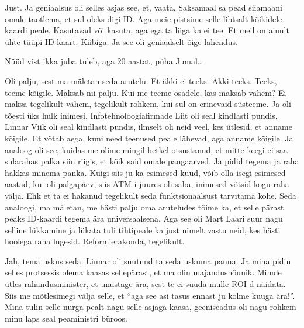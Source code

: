 
Just. Ja geniaalsus oli selles asjas see, et, vaata, Saksamaal sa pead 
siiamaani omale taotlema, et sul oleks digi-ID.  Aga meie pistsime selle 
lihtsalt kõikidele kaardi peale. Kasutavad või kasuta, aga ega ta liiga ka ei 
tee. Et meil on ainult ühte tüüpi ID-kaart. Kiibiga. Ja see oli geniaalselt 
õige lahendus.


Nüüd vist ikka juba tuleb, aga 20 aastat, püha Jumal\ldots


Oli palju, sest ma mäletan seda arutelu. Et äkki ei teeks. Äkki teeks. Teeks, 
teeme kõigile. Maksab nii palju. Kui me teeme osadele, kas maksab vähem? Ei 
maksa tegelikult vähem, tegelikult  rohkem, kui sul on erinevaid süsteeme. Ja 
oli tõesti üks hulk inimesi, Infotehnoloogiafirmade 
Liit oli seal kindlasti pundis, Linnar 
Viik oli seal kindlasti pundis, ilmselt oli neid  
veel, kes ütlesid, et anname kõigile. Et võtab aega, kuni need teenused peale 
lähevad, aga anname kõigile. Ja analoog oli see, kuidas me olime mingil hetkel 
otsustanud, et mitte keegi ei saa sularahas palka siin riigis, et kõik said 
omale pangaarved. Ja pidid tegema ja raha hakkas minema panka. Kuigi siis ju ka 
esimesed kuud, võib-olla isegi esimesed aastad, kui oli palgapäev, siis ATM-i 
juures oli saba, inimesed võtsid kogu raha välja. Ehk et ta ei hakanud 
tegelikult seda funktsionaalsust tarvitama kohe. Seda analoogi, ma mäletan, me 
hästi palju oma  aruteludes tõime ka, et selle pärast peaks ID-kaardi tegema 
ära universaalsena. Aga see oli Mart Laari suur nagu 
selline lükkamine ja lükata tuli tihtipeale ka just nimelt vastu neid, kes 
hästi hoolega raha lugesid. Reformierakonda, tegelikult.


Jah, tema uskus seda. Linnar oli suutnud ta seda 
uskuma panna. Ja mina pidin selles protsessis olema kaasas sellepärast, et ma 
olin majandusnõunik. Minule ütles rahandusminister, et unustage ära, sest te ei 
suuda mulle ROI-d näidata. Siis me mõtlesimegi välja selle, et  \enquote{aga 
see asi tasus ennast ju kolme kuuga ära!}. Mina tulin selle nurga pealt nagu 
selle asjaga kaasa,  geeniseadus oli nagu rohkem minu laps seal peaministri 
büroos.

